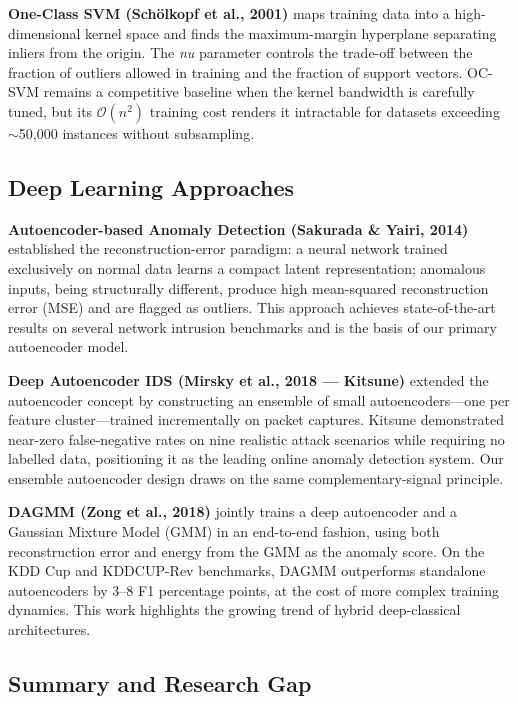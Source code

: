 \textbf{One-Class SVM (Schölkopf et al., 2001)} \cite{scholkopf2001ocsvm} maps training data into a high-dimensional kernel space and finds the maximum-margin hyperplane separating inliers from the origin. The \textit{nu} parameter controls the trade-off between the fraction of outliers allowed in training and the fraction of support vectors. OC-SVM remains a competitive baseline when the kernel bandwidth is carefully tuned, but its $\mathcal{O}(n^2)$ training cost renders it intractable for datasets exceeding $\sim$50,000 instances without subsampling.

\subsection{Deep Learning Approaches}

\textbf{Autoencoder-based Anomaly Detection (Sakurada \& Yairi, 2014)} \cite{sakurada2014autoencoder} established the reconstruction-error paradigm: a neural network trained exclusively on normal data learns a compact latent representation; anomalous inputs, being structurally different, produce high mean-squared reconstruction error (MSE) and are flagged as outliers. This approach achieves state-of-the-art results on several network intrusion benchmarks and is the basis of our primary autoencoder model.

\textbf{Deep Autoencoder IDS (Mirsky et al., 2018 — Kitsune)} \cite{mirsky2018kitsune} extended the autoencoder concept by constructing an ensemble of small autoencoders—one per feature cluster—trained incrementally on packet captures. Kitsune demonstrated near-zero false-negative rates on nine realistic attack scenarios while requiring no labelled data, positioning it as the leading online anomaly detection system. Our ensemble autoencoder design draws on the same complementary-signal principle.

\textbf{DAGMM (Zong et al., 2018)} \cite{zong2018dagmm} jointly trains a deep autoencoder and a Gaussian Mixture Model (GMM) in an end-to-end fashion, using both reconstruction error and energy from the GMM as the anomaly score. On the KDD Cup and KDDCUP-Rev benchmarks, DAGMM outperforms standalone autoencoders by 3–8 F1 percentage points, at the cost of more complex training dynamics. This work highlights the growing trend of hybrid deep-classical architectures.

\subsection{Summary and Research Gap}

